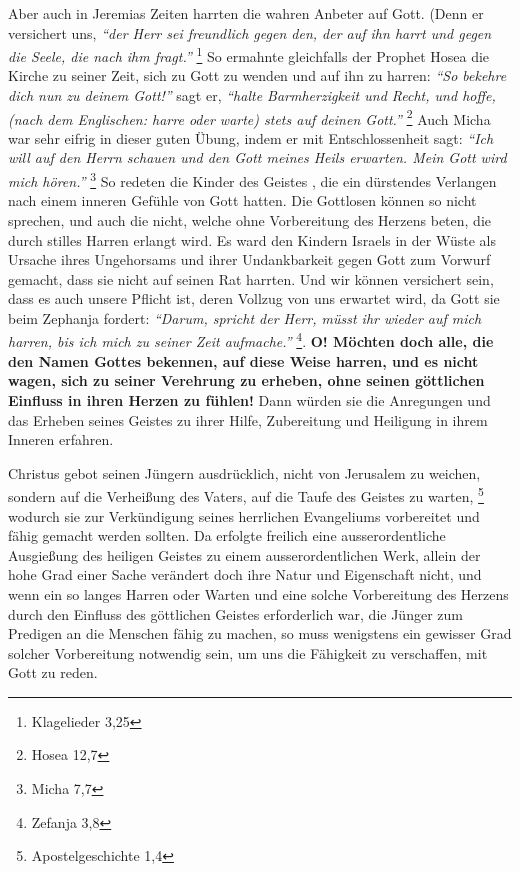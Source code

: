 \medskip

Aber auch in Jeremias  Zeiten harrten die wahren
Anbeter auf Gott. (Denn er
versichert uns,
\textit{ "`der Herr sei freundlich gegen den, der auf ihn harrt und
gegen die Seele, die nach ihm fragt."'}
\footnote{Klagelieder 3,25}
So ermahnte
gleichfalls der Prophet Hosea  die Kirche zu seiner Zeit,
sich zu Gott zu wenden
und auf ihn zu harren:
\textit{"`So bekehre dich nun zu deinem Gott!"'} sagt er,
\textit{"`halte
Barmherzigkeit und Recht, und hoffe, (nach dem Englischen: harre oder warte)
stets auf deinen Gott."'}
\footnote{Hosea 12,7}
Auch Micha  war sehr eifrig in
dieser guten Übung, indem er mit Entschlossenheit sagt:
\textit{"`Ich will auf den
Herrn schauen und den Gott meines Heils erwarten. Mein Gott wird mich
hören."'}
\footnote{Micha 7,7}
So redeten die Kinder des Geistes , die ein
dürstendes Verlangen nach einem inneren Gefühle von Gott hatten. Die Gottlosen
können so nicht sprechen, und auch die nicht, welche ohne Vorbereitung des
Herzens beten, die durch stilles Harren erlangt wird. Es ward den Kindern
Israels 
in der Wüste als Ursache ihres Ungehorsams und ihrer Undankbarkeit
gegen Gott zum Vorwurf gemacht, dass sie nicht auf seinen Rat harrten. Und
wir können versichert sein, dass es auch unsere Pflicht ist, deren Vollzug
von uns erwartet wird, da Gott sie beim Zephanja 
 fordert:
\textit{"`Darum, spricht
der Herr, müsst ihr wieder auf mich harren, bis ich mich zu seiner
Zeit aufmache."'}
\footnote{Zefanja 3,8}.
\textbf{O! Möchten doch alle, die den Namen
Gottes
bekennen, auf diese Weise harren, und es nicht wagen, sich zu seiner Verehrung
zu erheben, ohne seinen göttlichen Einfluss in ihren Herzen zu fühlen!} Dann
würden sie die Anregungen und das Erheben seines Geistes zu ihrer Hilfe,
Zubereitung
und Heiligung in ihrem Inneren erfahren.

\medskip

Christus gebot seinen Jüngern ausdrücklich, nicht von Jerusalem
 zu weichen,
sondern auf die Verheißung des Vaters, auf die Taufe des Geistes
 zu
warten,
\footnote{Apostelgeschichte 1,4}
wodurch sie zur Verkündigung  seines herrlichen
Evangeliums vorbereitet und fähig gemacht werden sollten. Da erfolgte freilich
eine ausserordentliche Ausgießung  des heiligen Geistes zu
einem
ausserordentlichen Werk, allein der hohe Grad einer Sache verändert doch ihre
Natur und Eigenschaft nicht, und wenn ein so langes Harren oder Warten und eine
solche Vorbereitung des Herzens durch den Einfluss des göttlichen Geistes
erforderlich war, die Jünger zum Predigen an die Menschen fähig zu machen, so
muss wenigstens ein gewisser Grad solcher Vorbereitung notwendig sein, um uns
die Fähigkeit zu verschaffen, mit Gott zu reden.

